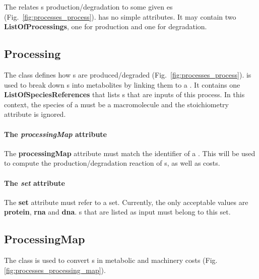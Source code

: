 The \processings{} relates \macromolecule{}s production/degradation to
some given \process{}es (Fig.~\ref{fig:processes_process}).
\processings{} has no simple attributes.
It may contain two \textbf{ListOfProcessings}, one for production and one for
degradation.


\subsection{Processing}
\label{sec:processing}

The \processing{} class defines how \macromolecule{}s are produced/degraded
(Fig.~\ref{fig:processes_process}).
\processing{} is used to break down \macromolecule{}s into metabolites
by linking them to a \processingmap.
It contains one \textbf{ListOfSpeciesReferences} that lists \macromolecule{}s
that are inputs of this process.
In this context, the species of a \speciesreference{} must be a macromolecule
and the stoichiometry attribute is ignored.

\paragraph{The \textit{processingMap} attribute}
The \textbf{processingMap} attribute must match the identifier of a
\processingmap.
This \processingmap{} will be used to compute the production/degradation
reaction of \macromolecule{}s, as well as \machinery{} costs.

\paragraph{The \textit{set} attribute}
The \textbf{set} attribute must refer to a \macromolecule{} set.
Currently, the only acceptable values are \textbf{protein}, \textbf{rna}
and \textbf{dna}.
\macromolecule{}s that are listed as input must belong to this set.


\subsection{ProcessingMap}
\label{sec:processing_map}

The \processingmap{} class is used to convert \macromolecule{}s in
metabolic and machinery costs (Fig.\ref{fig:processes_processing_map}).

